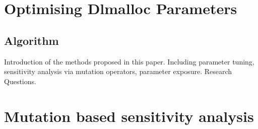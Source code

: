 \section{Optimising Dlmalloc Parameters}



\subsection{Algorithm}






Introduction of the methods proposed in this paper. Including parameter tuning, sensitivity analysis via mutation operators, parameter exposure. Research Questions.

\section{Mutation based sensitivity analysis}




